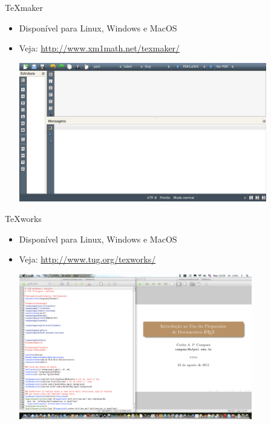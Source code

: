 \begin{frame}{TeXmaker}
\begin{itemize}
\item Disponível para Linux, Windows e MacOS
\item Veja: \url{http://www.xm1math.net/texmaker/}

\vspace{0.5cm}

\centering\includegraphics[width=0.85\textwidth]{img/texmaker.pdf}
\end{itemize}
\end{frame}

\begin{frame}{\TeX{works}}
\begin{itemize}
\item Disponível para Linux, Windows e MacOS
\item Veja: \url{http://www.tug.org/texworks/}

\vspace{0.25cm}

\centering\includegraphics[width=0.80\textwidth]{img/TeXworksPDF.pdf}
\end{itemize}
\end{frame}


